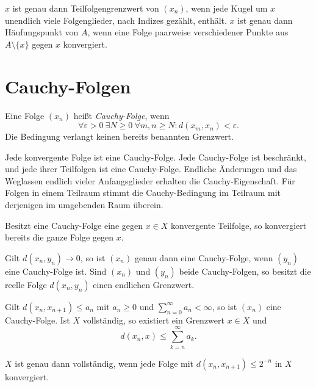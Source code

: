 \begin{theorem}
$x$ ist genau dann Teilfolgengrenzwert von $(x_n)$, wenn jede Kugel um $x$
unendlich viele Folgenglieder, nach Indizes gezählt, enthält.
$x$ ist genau dann Häufungspunkt von $A$, wenn eine Folge paarweise
verschiedener Punkte aus $A\setminus\{x\}$ gegen $x$ konvergiert.
\end{theorem}

\section{Cauchy-Folgen}

\begin{definition}
\label{b47guide:def:cauchy}
Eine Folge $(x_n)$ heißt \emph{Cauchy-Folge}, wenn
\[
 \forall\varepsilon>0\ \exists N\geq0\ \forall m,n\geq N:
 d(x_m,x_n)<\varepsilon.
\]
Die Bedingung verlangt keinen bereits benannten Grenzwert.
\end{definition}

\begin{theorem}
Jede konvergente Folge ist eine Cauchy-Folge. Jede Cauchy-Folge ist
beschränkt, und jede ihrer Teilfolgen ist eine Cauchy-Folge. Endliche
Änderungen und das Weglassen endlich vieler Anfangsglieder erhalten die
Cauchy-Eigenschaft. Für Folgen in einem Teilraum stimmt die Cauchy-Bedingung
im Teilraum mit derjenigen im umgebenden Raum überein.
\end{theorem}

\begin{theorem}
\label{b47guide:thm:cauchy-subsequence}
Besitzt eine Cauchy-Folge eine gegen $x\in X$ konvergente Teilfolge,
so konvergiert bereits die ganze Folge gegen $x$.
\end{theorem}

\begin{theorem}
Gilt $d(x_n,y_n)\to0$, so ist $(x_n)$ genau dann eine Cauchy-Folge, wenn
$(y_n)$ eine Cauchy-Folge ist. Sind $(x_n)$ und $(y_n)$ beide Cauchy-Folgen,
so besitzt die reelle Folge $d(x_n,y_n)$ einen endlichen Grenzwert.
\end{theorem}

\begin{theorem}
Gilt $d(x_n,x_{n+1})\leq a_n$ mit $a_n\geq0$ und
$\sum_{n=0}^{\infty}a_n<\infty$, so ist $(x_n)$ eine Cauchy-Folge.
Ist $X$ vollständig, so existiert ein Grenzwert $x\in X$ und
\[
 d(x_n,x)\leq\sum_{k=n}^{\infty}a_k.
\]
\end{theorem}

\begin{theorem}
$X$ ist genau dann vollständig, wenn jede Folge mit
$d(x_n,x_{n+1})\leq2^{-n}$ in $X$ konvergiert.
\end{theorem}